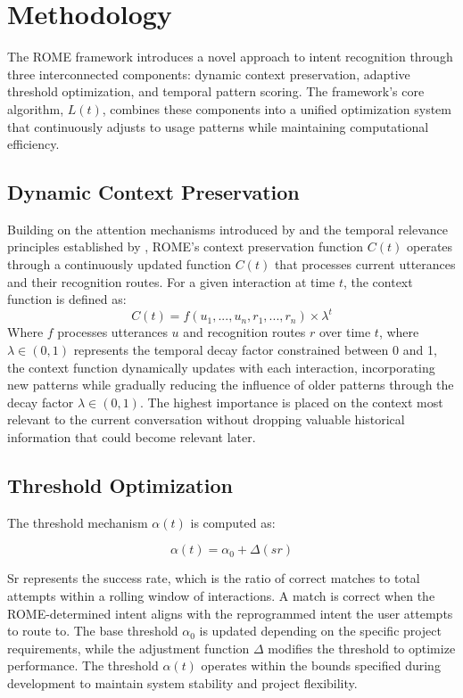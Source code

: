 \documentclass[12pt]{article}
\begin{document}
\section{Methodology}
The ROME framework introduces a novel approach to intent recognition through three interconnected components: dynamic context preservation, adaptive threshold optimization, and temporal pattern scoring. The framework's core algorithm, $L(t)$, combines these components into a unified optimization system that continuously adjusts to usage patterns while maintaining computational efficiency.

\subsection{Dynamic Context Preservation}
Building on the attention mechanisms introduced by \citet{vaswani2017} and the temporal relevance principles established by \citet{li2003}, ROME's context preservation function $C(t)$ operates through a continuously updated function $C(t)$ that processes current utterances and their recognition routes. For a given interaction at time $t$, the context function is defined as:
$$C(t) = f(u_1,...,u_n, r_1,...,r_n) \times \lambda^t$$
Where $f$ processes utterances $u$ and recognition routes $r$ over time $t$, where $\lambda \in (0,1)$ represents the temporal decay factor constrained between 0 and 1, the context function dynamically updates with each interaction, incorporating new patterns while gradually reducing the influence of older patterns through the decay factor $\lambda \in (0,1)$. The highest importance is placed on the context most relevant to the current conversation without dropping valuable historical information that could become relevant later.

\subsection{Threshold Optimization}
The threshold mechanism $\alpha(t)$ is computed as:

$$\alpha(t) = \alpha_0 + \Delta(sr)$$

Sr represents the success rate, which is the ratio of correct matches to total attempts within a rolling window of interactions. A match is correct when the ROME-determined intent aligns with the reprogrammed intent the user attempts to route to. The base threshold $\alpha_0$ is updated depending on the specific project requirements, while the adjustment function $\Delta$ modifies the threshold to optimize performance. The threshold $\alpha(t)$ operates within the bounds specified during development to maintain system stability and project flexibility.
\end{document}
